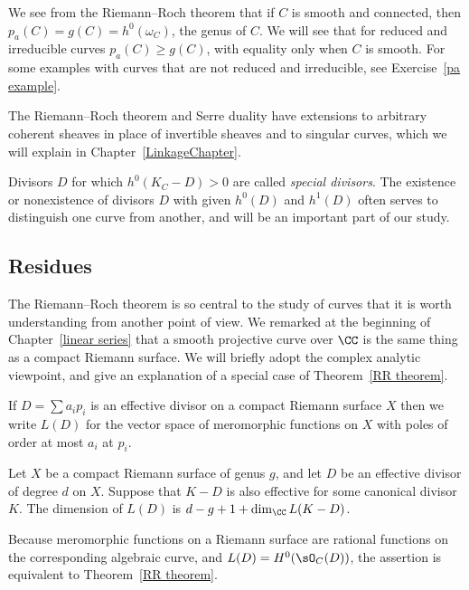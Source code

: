 We see from the Riemann--Roch theorem that if $C$ is smooth and connected, then $p_a(C) = g(C) = h^0(\omega_C)$, the genus of $C$. We
will see that for reduced and irreducible curves $p_a(C) \geq g(C)$, with equality only when $C$ is smooth.
  For some examples with curves that are not
reduced and irreducible, see Exercise~\ref{pa example}.
  

The Riemann--Roch theorem and Serre duality have extensions to arbitrary coherent sheaves in place of invertible sheaves 
and to singular curves, which we will explain in Chapter~\ref{LinkageChapter}.

Divisors $D$ for which $h^0(K_C - D)>0$ are called \emph{special divisors}. The existence or nonexistence of divisors $D$ with given $h^{0}(D)$ and $h^{1}(D)$ often serves to distinguish one curve from another, and will be an important part of our study.

\subsection*{Residues} 

The 
Rie\-mann--Roch theorem is so central to the study of curves that it is worth understanding from another point
of view.
We remarked at the beginning of Chapter~\ref{linear series} that a
smooth projective curve over $\CC$ is the same thing as a compact
Riemann surface. 
We will briefly adopt
the complex analytic viewpoint, and give an explanation of 
%
a special case of Theorem~\ref{RR theorem}.

If $D = \sum a_ip_i$ is an effective divisor 
on a compact Riemann surface $X$ then we write $L(D)$ 
for the vector space of meromorphic functions on $X$ with poles of order 
at most $a_i$ at $p_i$. 

\begin{theorem}
Let $X$ be a compact Riemann surface of genus $g$, and let $D$ be an effective divisor of degree $d$ on $X$. Suppose that $K-D$ is also effective for some canonical divisor $K$.
The dimension of  $L(D)$ is
$d-g+1+\dim_\CC L(K-D)$.
\end{theorem}
Because  meromorphic functions on a Riemann surface are rational functions on the corresponding
algebraic curve, and $L(D) = H^0(\sO_C(D))$, the assertion is equivalent to Theorem~\ref{RR theorem}.

